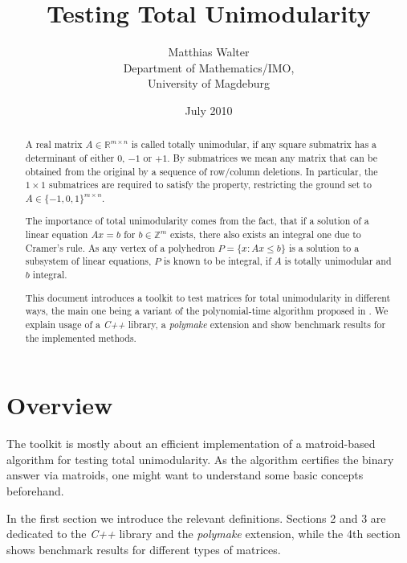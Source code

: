 \documentclass[12pt]{article}
\newcommand{\R}{\ensuremath{\mathbb{R}}}
\newcommand{\Z}{\ensuremath{\mathbb{Z}}}
\newcommand{\Cpp}{{\em C++ }}
\newcommand{\Polymake}{{\em polymake }}
\begin{document}
\topmargin 20mm
\pagestyle{empty}


\title{\huge \bf Testing Total Unimodularity}

\date{July 2010}
\author{Matthias Walter\\ Department of Mathematics/IMO, \\ University of Magdeburg}

\maketitle

\begin{abstract}
A real matrix $A \in \R^{m \times n}$ is called totally unimodular, if any square submatrix
has a determinant of either $0$, $-1$ or $+1$. By submatrices we mean any matrix that can be obtained from
the original by a sequence of row/column deletions. In particular, the $1 \times 1$ submatrices
are required to satisfy the property, restricting the ground set to $A \in \{-1, 0, 1\}^{m \times n}$.

The importance of total unimodularity comes from the fact, that if a solution of
a linear equation $A x = b$ for $b \in \Z^m$ exists, there also exists an integral one due to Cramer's rule. As any vertex
of a polyhedron $P = \{ x : Ax \leq b \}$ is a solution to a subsystem of linear equations,
$P$ is known to be integral, if $A$ is totally unimodular and $b$ integral.

This document introduces a toolkit to test matrices for total unimodularity in different ways,
the main one being a variant of the polynomial-time algorithm proposed in \cite{Truemper90V}.
We explain usage of a \Cpp library, a \Polymake extension and show benchmark results for the implemented methods.

\end{abstract}

\bigskip

\section*{Overview}

The toolkit is mostly about an efficient implementation of a matroid-based algorithm for testing total unimodularity.
As the algorithm certifies the binary answer via matroids, one might want to understand some basic concepts beforehand.

In the first section we introduce the relevant definitions. Sections 2 and 3 are dedicated to the \Cpp library
and the \Polymake extension, while the 4th section shows benchmark results for different types of matrices.
\end{document}
